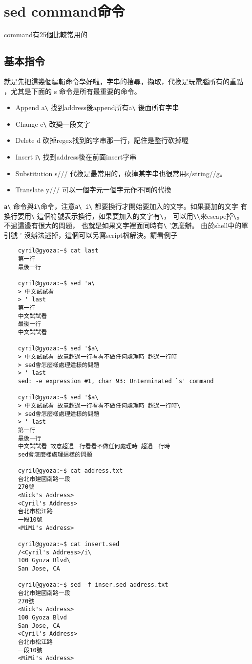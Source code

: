     \section{sed command命令}
    command有25個比較常用的
    \subsection{基本指令}
    就是先把這幾個編輯命令學好啦，字串的搜尋，擷取，代換是玩電腦所有的重點
    ，尤其是下面的 s 命令是所有最重要的命令。
    \begin{itemize}
    \item Append       a\verb=\=    找到address後append所有a\verb=\=
                                    後面所有字串
    \item Change       c\verb=\=    改變一段文字
    \item Delete       d     砍掉regex找到的字串那一行，記住是整行砍掉喔
    \item Insert       i\verb=\=    找到address後在前面insert字串
    \item Substitution s///  代換是最常用的，砍掉某字串也很常用s/string//g。
    \item Translate    y///  可以一個字元一個字元作不同的代換
    \end{itemize}
    \verb=a\= 命令與\verb=i\=命令，注意\verb=a\ i\= 
    都要換行才開始要加入的文字。如果要加的文字
    有換行要用\verb=\= 這個符號表示換行，如果要加入的文字有\verb=\=，
    可以用\verb=\\=來escape掉\verb=\=。不過這邊有很大的問題，
    也就是如果文字裡面同時有\verb=\= '怎麼辦。
    由於shell中的單引號 ' 沒辦法逃掉，這個可以另寫script檔解決。請看例子
    \begin{verbatim}
    cyril@gyoza:~$ cat last
    第一行
    最後一行

    cyril@gyoza:~$ sed 'a\
    > 中文試試看
    > ' last
    第一行
    中文試試看
    最後一行
    中文試試看

    cyril@gyoza:~$ sed '$a\
    > 中文試試看 故意超過一行看看不做任何處理時 超過一行時
    > sed會怎麼樣處理這樣的問題
    > ' last
    sed: -e expression #1, char 93: Unterminated `s' command

    cyril@gyoza:~$ sed '$a\
    > 中文試試看 故意超過一行看看不做任何處理時 超過一行時\
    > sed會怎麼樣處理這樣的問題
    > ' last
    第一行
    最後一行 
    中文試試看 故意超過一行看看不做任何處理時 超過一行時
    sed會怎麼樣處理這樣的問題
    
    cyril@gyoza:~$ cat address.txt
    台北市建國南路一段
    270號
    <Nick's Address>
    <Cyril's Address>
    台北市松江路
    一段10號
    <MiMi's Address>
    
    cyril@gyoza:~$ cat insert.sed
    /<Cyril's Address>/i\
    100 Gyoza Blvd\
    San Jose, CA
    
    cyril@gyoza:~$ sed -f inser.sed address.txt
    台北市建國南路一段
    270號
    <Nick's Address>
    100 Gyoza Blvd
    San Jose, CA
    <Cyril's Address>
    台北市松江路
    一段10號
    <MiMi's Address>
    
    \end{verbatim}
